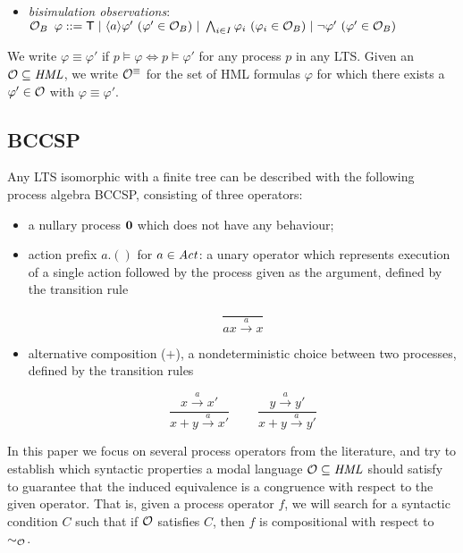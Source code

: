 \documentclass{eptcs}
\def\hmo{{\cal O}}
\def\hml{{\it HML}}
\def\eqhmo{\sim_{\hmo}}
\def\transa{\stackrel{a}{\rightarrow}}
\def\transa{\stackrel{a}{\rightarrow}}
\def\true{{\sf T}}
\newcommand{\diam}[1]{\langle#1\rangle}
\begin{document}
\begin{itemize}
	\item \textit{ bisimulation observations}:\\
	$\hmo_{B} \hspace{5.0 pt} \varphi ::= \true \hspace{3.0 pt}|\hspace{3.0 pt} \diam{a} \varphi '~(\varphi' \in \hmo_{B}) \hspace{3.0 pt}|\hspace{3.0 pt} \bigwedge_{i \in I} \varphi_{i}~(\varphi_{i} \in \hmo_{B})\hspace{3.0 pt}|\hspace{3.0 pt} \neg \varphi '~(\varphi ' \in \hmo_{B}) $
	\end{itemize}

\vspace{2mm}
We write $\varphi\equiv\varphi'$ if $p\models\varphi\Leftrightarrow p\models\varphi'$ for any process $p$ in any LTS.
Given an $\hmo\subseteq\hml$, we write $\hmo^\equiv$ for the set of HML formulas $\varphi$ for which there
exists a $\varphi'\in\hmo$ with $\varphi\equiv\varphi'$.


\subsection{BCCSP}

Any LTS isomorphic with a finite tree can be described with the following process algebra BCCSP, consisting of three operators:
	
\begin{itemize}
\item a nullary process ${\bf 0}$ which does not have any behaviour;
\item action prefix $a.()$ for $a\in{\it Act}$: a unary operator which represents execution of a single action followed by the process given as the argument, defined by the transition rule
\begin{center}
\[ \frac{}{ax \transa x} \]
\end{center}
\item alternative composition ($+$), a nondeterministic choice between two processes, defined by the transition rules
\begin{center}
\[ \frac{x \transa x'}{x + y \transa x'} 
~~~~~~~~~~ \frac{y \transa y'}{x + y \transa y'}\]
\end{center}
\end{itemize}
	
In this paper we focus on several process operators from the literature, and try to establish which syntactic properties a modal language $\hmo \subseteq \hml$ should satisfy to guarantee that the induced equivalence is a congruence with respect to the given operator. That is, given a process operator $f$, we will search for a syntactic condition $C$ such that if $\hmo$ satisfies $C$, then $f$ is compositional with respect to $\eqhmo$.
\end{document}
